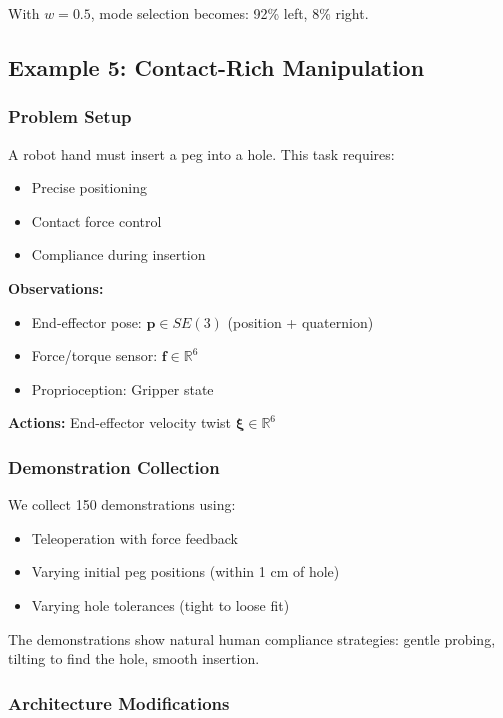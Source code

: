 With $w = 0.5$, mode selection becomes: 92\% left, 8\% right.

\subsection{Example 5: Contact-Rich Manipulation}
\label{subsec:example_contact_manipulation}

\subsubsection{Problem Setup}

A robot hand must insert a peg into a hole. This task requires:
\begin{itemize}
    \item Precise positioning
    \item Contact force control
    \item Compliance during insertion
\end{itemize}

\textbf{Observations:}
\begin{itemize}
    \item End-effector pose: $\mathbf{p} \in SE(3)$ (position + quaternion)
    \item Force/torque sensor: $\mathbf{f} \in \mathbb{R}^6$
    \item Proprioception: Gripper state
\end{itemize}

\textbf{Actions:} End-effector velocity twist $\boldsymbol{\xi} \in \mathbb{R}^6$

\subsubsection{Demonstration Collection}

We collect 150 demonstrations using:
\begin{itemize}
    \item Teleoperation with force feedback
    \item Varying initial peg positions (within 1 cm of hole)
    \item Varying hole tolerances (tight to loose fit)
\end{itemize}

The demonstrations show natural human compliance strategies: gentle probing, tilting to find the hole, smooth insertion.

\subsubsection{Architecture Modifications}

